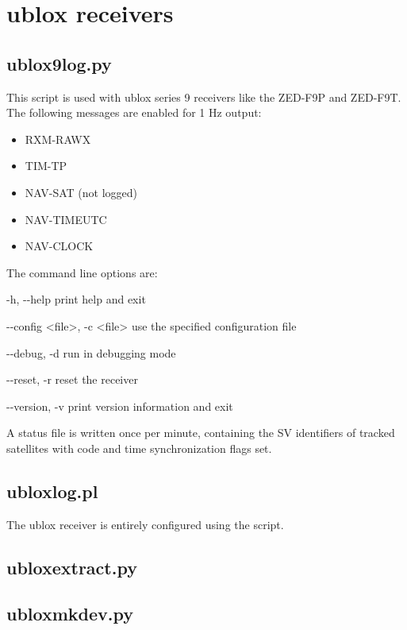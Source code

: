 \section{ublox receivers}

\subsection{ublox9log.py}

\hypertarget{h:ublox9log}{}

This  script is used with ublox series 9 receivers like the ZED-F9P and ZED-F9T.
The following messages are enabled for 1 Hz output:
\begin{itemize}
	\item RXM-RAWX 
	\item TIM-TP
	\item NAV-SAT (not logged)
	\item NAV-TIMEUTC
	\item NAV-CLOCK
\end{itemize}

The command line options are:
\begin{description*}
 \item[-h, -{}-help] print help and exit
 \item[-{}-config \textless file\textgreater, -c \textless file\textgreater] use the specified configuration file
 \item[-{}-debug, -d]           run in debugging mode
 \item[-{}-reset, -r]           reset the receiver
  \item[-{}-version, -v]        print version information and exit
\end{description*}

A status file is written once per minute, containing the SV identifiers of  tracked satellites with
code and time synchronization flags set.

\subsection{ubloxlog.pl}

\hypertarget{h:ubloxlog}{}

The ublox receiver is entirely configured using the script.

\subsection{ubloxextract.py}

\hypertarget{h:ubloxextract}{}

\subsection{ubloxmkdev.py}

\hypertarget{h:ubloxmkdev}{}
